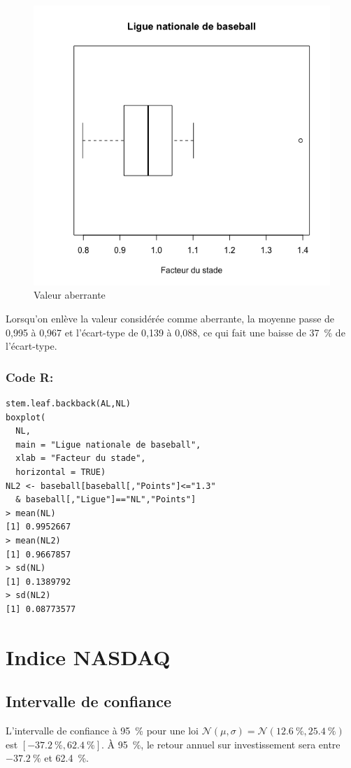 \documentclass[10pt,twocolumn]{article}
\begin{document}
\begin{figure}[htbp]
	\caption{Valeur aberrante}
	\label{baseballBoxplot}
	\centering
	\includegraphics[width=\linewidth]{d1_baseballBoxplot}
\end{figure}

Lorsqu’on enlève la valeur considérée comme aberrante, la moyenne passe de 0,995 à 0,967 et l’écart-type de 0,139 à 0,088, ce qui fait une baisse de 37~\% de l’écart-type.

\subsubsection*{Code R:}
\begin{verbatim}
stem.leaf.backback(AL,NL)
boxplot(
  NL,
  main = "Ligue nationale de baseball",
  xlab = "Facteur du stade",
  horizontal = TRUE)
NL2 <- baseball[baseball[,"Points"]<="1.3"
  & baseball[,"Ligue"]=="NL","Points"]
> mean(NL)
[1] 0.9952667
> mean(NL2)
[1] 0.9667857
> sd(NL)
[1] 0.1389792
> sd(NL2)
[1] 0.08773577
\end{verbatim}



\section{Indice NASDAQ}

\subsection{Intervalle de confiance}
L’intervalle de confiance à 95~\% pour une loi $\mathcal{N}(\mu,\sigma) = \mathcal{N}(12.6~\%, 25.4~\%)$ est $[-37.2~\%, 62.4~\%]$. À 95~\%, le retour annuel sur investissement sera entre $-37.2~\%$ et 62.4~\%.
\end{document}
